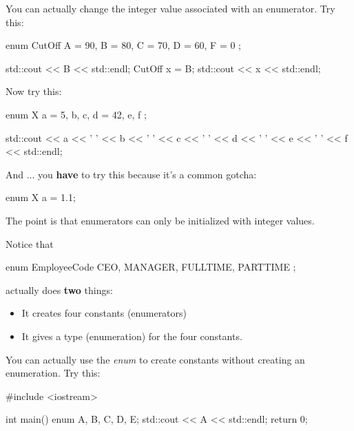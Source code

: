 \newpage{}

You can actually change the integer value associated with an enumerator.
Try this:

\begin{consolethree}[escapeinside=||]
enum CutOff
{
    A = 90, B = 80, C = 70, D = 60, F = 0
};

std::cout << B << std::endl;
CutOff x = B;
std::cout << x << std::endl;
\end{consolethree}

Now try this:

\begin{consolethree}[escapeinside=||]
enum X
{
    a = 5, b, c, d = 42, e, f
};

std::cout << a << ' ' << b << ' ' << c << ' '
          << d << ' ' << e << ' ' << f << std::endl;
\end{consolethree}

And ... you \textbf{have} to try this because
it's a common gotcha:

\begin{consolethree}[escapeinside=||]
enum X {a = 1.1};
\end{consolethree}

The point is that enumerators can only be initialized with integer
values.




\newpage{}

Notice that

\begin{consolethree}[escapeinside=||]
enum EmployeeCode
{
    CEO, MANAGER, FULLTIME, PARTTIME
};
\end{consolethree}

actually does \textbf{two} things:

\begin{itemize}
\item It creates four constants (enumerators)
\item It gives a type (enumeration) for the four constants.
\end{itemize}

You can actually use the \textit{enum} to create constants without
creating an enumeration. Try this:

\begin{consolethree}[escapeinside=||]
#include <iostream>

int main()
{
    enum {A, B, C, D, E};
    std::cout << A << std::endl;
    return 0;
}
\end{consolethree}

